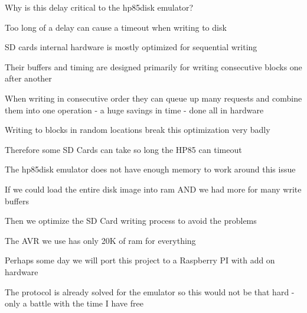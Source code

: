 \begin{DoxyItemize}
\begin{DoxyItemize}
\begin{DoxyItemize}
\begin{DoxyItemize}
\end{DoxyItemize}
\item Why is this delay critical to the hp85disk emulator?
\begin{DoxyItemize}
\item Too long of a delay can cause a timeout when writing to disk
\item SD cards internal hardware is mostly optimized for sequential writing
\begin{DoxyItemize}
\item Their buffers and timing are designed primarily for writing consecutive blocks one after another
\begin{DoxyItemize}
\item When writing in consecutive order they can queue up many requests and combine them into one operation -\/ a huge savings in time -\/ done all in hardware
\item Writing to blocks in random locations break this optimization very badly
\begin{DoxyItemize}
\item Therefore some SD Cards can take so long the H\+P85 can timeout
\end{DoxyItemize}
\end{DoxyItemize}
\item The hp85disk emulator does not have enough memory to work around this issue
\begin{DoxyItemize}
\item If we could load the entire disk image into ram A\+ND we had more for many write buffers
\begin{DoxyItemize}
\item Then we optimize the SD Card writing process to avoid the problems
\end{DoxyItemize}
\item The A\+VR we use has only 20K of ram for everything
\begin{DoxyItemize}
\item Perhaps some day we will port this project to a Raspberry PI with add on hardware
\begin{DoxyItemize}
\item The protocol is already solved for the emulator so this would not be that hard -\/ only a battle with the time I have free
\end{DoxyItemize}
\end{DoxyItemize}
\end{DoxyItemize}
\end{DoxyItemize}
\end{DoxyItemize}
\end{DoxyItemize}
\end{DoxyItemize}
\end{DoxyItemize}






